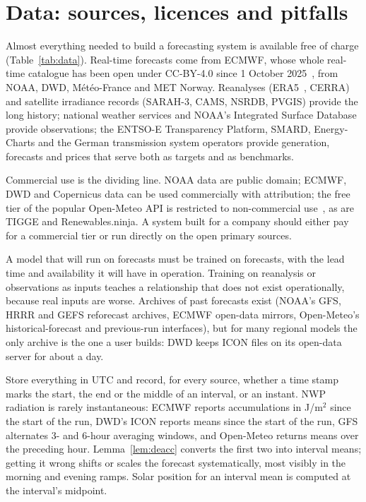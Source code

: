 \section{Data: sources, licences and pitfalls}
\label{sec:data}

 Almost everything needed to build a forecasting system is available free of charge (Table~\ref{tab:data}). Real-time forecasts come from ECMWF, whose whole real-time catalogue has been open under CC-BY-4.0 since 1 October 2025~\cite{ecmwf2025opendata}, from NOAA, DWD, M\'et\'eo-France and MET Norway. Reanalyses (ERA5~\cite{hersbach2020era5}, CERRA) and satellite irradiance records (SARAH-3, CAMS, NSRDB, PVGIS) provide the long history; national weather services and NOAA's Integrated Surface Database~\cite{smith2011isd} provide observations; the ENTSO-E Transparency Platform, SMARD, Energy-Charts and the German transmission system operators provide generation, forecasts and prices that serve both as targets and as benchmarks.



 Commercial use is the dividing line. NOAA data are public domain; ECMWF, DWD and Copernicus data can be used commercially with attribution; the free tier of the popular Open-Meteo API is restricted to non-commercial use~\cite{openmeteo2026terms}, as are TIGGE and Renewables.ninja. A system built for a company should either pay for a commercial tier or run directly on the open primary sources.

 A model that will run on forecasts must be trained on forecasts, with the lead time and availability it will have in operation. Training on reanalysis or observations as inputs teaches a relationship that does not exist operationally, because real inputs are worse. Archives of past forecasts exist (NOAA's GFS, HRRR and GEFS reforecast archives, ECMWF open-data mirrors, Open-Meteo's historical-forecast and previous-run interfaces), but for many regional models the only archive is the one a user builds: DWD keeps ICON files on its open-data server for about a day.

 Store everything in UTC and record, for every source, whether a time stamp marks the start, the end or the middle of an interval, or an instant. NWP radiation is rarely instantaneous: ECMWF reports accumulations in J/m$^2$ since the start of the run, DWD's ICON reports means since the start of the run, GFS alternates 3- and 6-hour averaging windows, and Open-Meteo returns means over the preceding hour. Lemma~\ref{lem:deacc} converts the first two into interval means; getting it wrong shifts or scales the forecast systematically, most visibly in the morning and evening ramps. Solar position for an interval mean is computed at the interval's midpoint.

